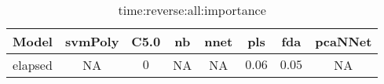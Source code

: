 \begin{table}[!ht]
	\centering
	\begin{tabular}{|c|c|c|c|c|c|c|c|}
		\hline
		Model & svmPoly & C5.0 & nb & nnet & pls & fda & pcaNNet \\ \hline
		elapsed & NA & $0$ & NA & NA & $0.06$ & $0.05$ & NA \\ \hline
	\end{tabular}
	\caption{time:reverse:all:importance}
	\label{tab:time:reverse:all:importance}
\end{table}
